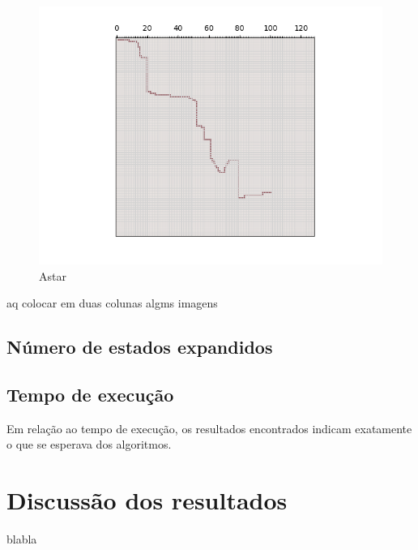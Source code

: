 \documentclass{article}
\begin{document}
\begin{figure}[H]
	\centering
	\includegraphics[width=1.0\textwidth]{../images/paths/Astar.png}
	\caption{Astar}
\end{figure}

aq colocar em duas colunas algms imagens

\subsection{Número de estados expandidos}

\subsection{Tempo de execução}

Em relação ao tempo de execução, os resultados encontrados indicam exatamente o que se esperava dos algoritmos.

\section{Discussão dos resultados}

blabla
\end{document}
